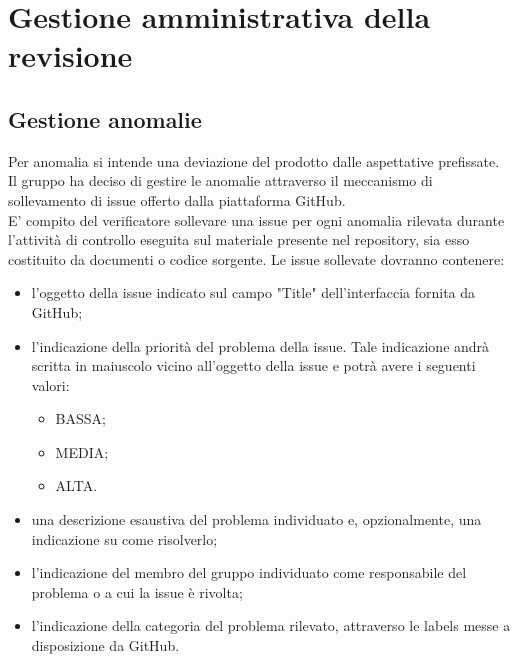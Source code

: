 \section{Gestione amministrativa della revisione}
	\subsection{Gestione anomalie}
		Per anomalia si intende una deviazione del prodotto dalle aspettative prefissate. \\
		Il gruppo ha deciso di gestire le anomalie attraverso il meccanismo di sollevamento di issue offerto dalla piattaforma GitHub.\\
		E' compito del verificatore sollevare una issue per ogni anomalia rilevata durante l'attività di controllo eseguita sul materiale presente nel repository, sia esso costituito da documenti o codice sorgente.
		Le issue sollevate dovranno contenere:
		\begin{itemize}
			\item l'oggetto della issue indicato sul campo "Title" dell'interfaccia fornita da GitHub;
			\item l'indicazione della priorità del problema della issue. Tale indicazione andrà scritta in maiuscolo vicino all'oggetto della issue e potrà avere i seguenti valori:
				\begin{itemize}
					\item BASSA;
					\item MEDIA;
					\item ALTA.
				\end{itemize}
			\item una descrizione esaustiva del problema individuato e, opzionalmente, una indicazione su come risolverlo;
			\item l'indicazione del membro del gruppo \groupname{} individuato come responsabile del problema o a cui la issue è rivolta;
			\item l'indicazione della categoria del problema rilevato, attraverso le labels messe a disposizione da GitHub.
		\end{itemize}